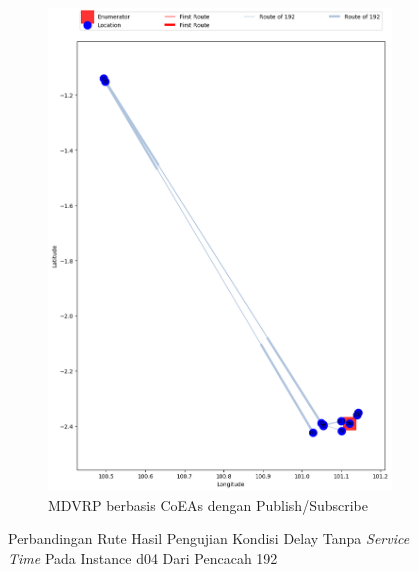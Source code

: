 \begin{figure}[H]\ContinuedFloat
	\centering
	\begin{subfigure}[t]{\textwidth}
		\centering
		\includegraphics[width=\textwidth]{Resources/Images/delayed_4/real_m15_n100_delayed_4_192_pubsub_coes}
		\caption{MDVRP berbasis CoEAs dengan Publish/Subscribe}
		\label{fig:real_m15_n100_delayed_4_192_pubsub_coes}
	\end{subfigure}
	\caption{Perbandingan Rute Hasil Pengujian Kondisi Delay Tanpa \textit{Service Time} Pada Instance d04 Dari Pencacah 192}
	\label{fig:real_m15_n100_delayed_4_192_contd}
\end{figure}


